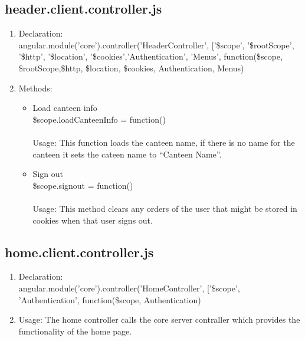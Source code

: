 \documentclass[a4paper,12pt]{article}
\begin{document}
\subsection{header.client.controller.js}
\begin{enumerate}
\item Declaration:\\ angular.module('core').controller('HeaderController', ['\$scope', '\$rootScope', '\$http', '\$location', '\$cookies','Authentication', 'Menus',
	function(\$scope, \$rootScope,\$http, \$location, \$cookies, Authentication, Menus)
	\item Methods:\\
	\begin{itemize}
	\item Load canteen info\\
	\$scope.loadCanteenInfo = function()\\ \\
	Usage: This function loads the canteen name, if there is no name for the canteen it sets the cateen name to ``Canteen Name''.
	\item Sign out\\
	\$scope.signout = function()\\ \\
	Usage: This method clears any orders of the user that might be stored in cookies when that user signs out.
	
	\end{itemize}
\end{enumerate}
\subsection{home.client.controller.js}
\begin{enumerate}
\item Declaration:\\ angular.module('core').controller('HomeController', ['\$scope', 'Authentication',
	function(\$scope, Authentication)
\item Usage: The home controller calls the core server contraller which provides the functionality of the home page.
\end{enumerate}
\end{document}
